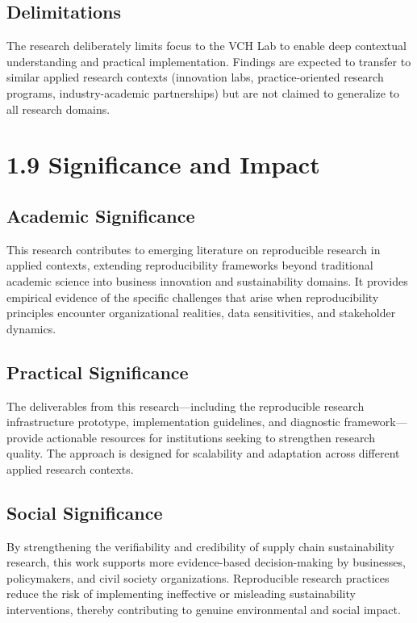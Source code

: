 \documentclass[
  oneside,
  open=any]{scrbook}
\begin{document}
\subsection{Delimitations}\label{delimitations}

The research deliberately limits focus to the VCH Lab to enable deep
contextual understanding and practical implementation. Findings are
expected to transfer to similar applied research contexts (innovation
labs, practice-oriented research programs, industry-academic
partnerships) but are not claimed to generalize to all research domains.

\section{1.9 Significance and Impact}\label{significance-and-impact}

\subsection{Academic Significance}\label{academic-significance}

This research contributes to emerging literature on reproducible
research in applied contexts, extending reproducibility frameworks
beyond traditional academic science into business innovation and
sustainability domains. It provides empirical evidence of the specific
challenges that arise when reproducibility principles encounter
organizational realities, data sensitivities, and stakeholder dynamics.

\subsection{Practical Significance}\label{practical-significance}

The deliverables from this research---including the reproducible
research infrastructure prototype, implementation guidelines, and
diagnostic framework---provide actionable resources for institutions
seeking to strengthen research quality. The approach is designed for
scalability and adaptation across different applied research contexts.

\subsection{Social Significance}\label{social-significance}

By strengthening the verifiability and credibility of supply chain
sustainability research, this work supports more evidence-based
decision-making by businesses, policymakers, and civil society
organizations. Reproducible research practices reduce the risk of
implementing ineffective or misleading sustainability interventions,
thereby contributing to genuine environmental and social impact.
\end{document}
